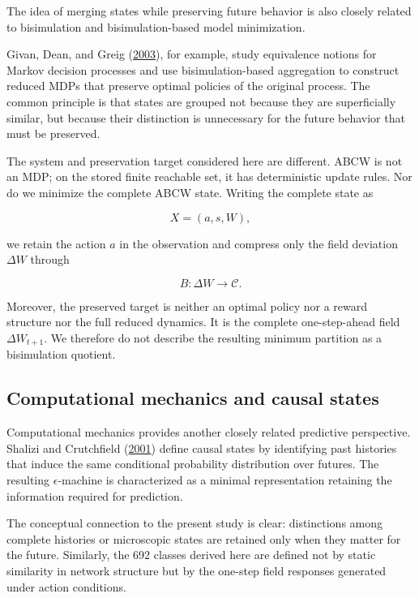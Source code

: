 \documentclass[
  11pt,
]{article}
\begin{document}
The idea of merging states while preserving future behavior is also
closely related to bisimulation and bisimulation-based model
minimization.

Givan, Dean, and Greig (\protect\hyperlink{ref-givan2003}{2003}), for
example, study equivalence notions for Markov decision processes and use
bisimulation-based aggregation to construct reduced MDPs that preserve
optimal policies of the original process. The common principle is that
states are grouped not because they are superficially similar, but
because their distinction is unnecessary for the future behavior that
must be preserved.

The system and preservation target considered here are different. ABCW
is not an MDP; on the stored finite reachable set, it has deterministic
update rules. Nor do we minimize the complete ABCW state. Writing the
complete state as

\[{X=(a,s,W),}\]

we retain the action \({a}\) in the observation and compress only the
field deviation \({\Delta W}\) through

\[{B:\Delta W\longrightarrow\mathcal C.}\]

Moreover, the preserved target is neither an optimal policy nor a reward
structure nor the full reduced dynamics. It is the complete
one-step-ahead field \({\Delta W_{t+1}}\). We therefore do not describe
the resulting minimum partition as a bisimulation quotient.

\hypertarget{computational-mechanics-and-causal-states}{%
\subsection{Computational mechanics and causal
states}\label{computational-mechanics-and-causal-states}}

Computational mechanics provides another closely related predictive
perspective. Shalizi and Crutchfield
(\protect\hyperlink{ref-shalizi2001}{2001}) define causal states by
identifying past histories that induce the same conditional probability
distribution over futures. The resulting \({\epsilon}\)-machine is
characterized as a minimal representation retaining the information
required for prediction.

The conceptual connection to the present study is clear: distinctions
among complete histories or microscopic states are retained only when
they matter for the future. Similarly, the 692 classes derived here are
defined not by static similarity in network structure but by the
one-step field responses generated under action conditions.
\end{document}
